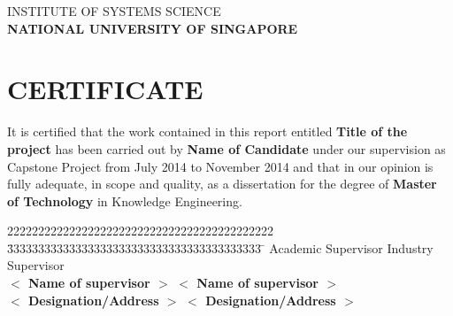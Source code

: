 \documentclass[titlepage,a4paper,12pt,thmsb]{report}
\begin{document}
\begin{titlepage}
\begin{center}
\vspace{1.5cm}

\large{\color{blue} INSTITUTE OF SYSTEMS SCIENCE} \\
\Large{\color{blue} \bf NATIONAL UNIVERSITY OF SINGAPORE}\\

\vskip 0.25cm

{\color{black} \centering {}}
\end{center}

\pagebreak
\end{titlepage}


\chapter*{CERTIFICATE}
It is certified that the work contained in this report entitled {\bf Title of the project} has been carried out by {\bf Name of Candidate} under our supervision as Capstone Project from July 2014 to November 2014 and that in our opinion is fully adequate, in scope and quality, as a dissertation for the degree of {\bf Master of Technology} in {Knowledge Engineering}.\\

\vspace*{0.25cm}

\begin{tabbing}
2222222222222222222222222222222222222222222             \= 33333333333333333333333333333333333333333 \= \kill
{\sc Academic Supervisor}                                \> {\sc Industry Supervisor} \\
{\bf $<$ Name of supervisor $>$}                         \> {\bf $<$ Name of supervisor $>$} \\
{\bf $<$ Designation/Address $>$}                    \> {\bf $<$ Designation/Address $>$} \\
\end{tabbing}

\smallskip
\end{document}
